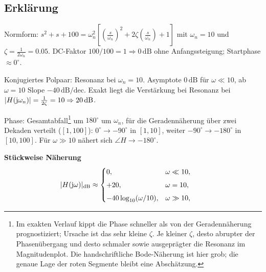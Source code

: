 \subsection{Erklärung}
\vspace{5mm}
\begin{description}[leftmargin=1.2em,labelsep=.6em,font=\bfseries]
\item[Schritt 1] Normform: $s^2+s+100=\omega_n^2\!\left[\left(\tfrac{s}{\omega_n}\right)^2+2\zeta\left(\tfrac{s}{\omega_n}\right)+1\right]$ mit $\omega_n=10$ und $\zeta=\tfrac{1}{2\omega_n}=0.05$. DC-Faktor $100/100=1\Rightarrow 0\,\mathrm{dB}$ ohne Anfangssteigung; Startphase $\approx0^\circ$.
\item[Schritt 2] Konjugiertes Polpaar: Resonanz bei $\omega_n=10$. Asymptote $0\,\mathrm{dB}$ für $\omega\ll10$, ab $\omega=10$ Slope $-40\,\mathrm{dB/dec}$. Exakt liegt die Verstärkung bei Resonanz bei $|H(\operatorname{j}\!\omega_n)|=\tfrac{1}{2\zeta}=10\Rightarrow20\,\mathrm{dB}$.
\item[Schritt 3] Phase: Gesamtabfall\footnote{Im exakten Verlauf kippt die Phase schneller als von der Geradennäherung prognostiziert; Ursache ist das sehr kleine \(\zeta\). Je kleiner \(\zeta\), desto abrupter der Phasenübergang und desto schmaler sowie ausgeprägter die Resonanz im Magnitudenplot. Die handschriftliche Bode-Näherung ist hier grob; die genaue Lage der roten Segmente bleibt eine Abschätzung.} um $180^\circ$ um $\omega_n$, für die Geradennäherung über zwei Dekaden verteilt ($[1,100]$): $0^\circ\to-90^\circ$ in $[1,10]$, weiter $-90^\circ\to-180^\circ$ in $[10,100]$. Für $\omega\gg10$ nähert sich $\angle H\to-180^\circ$.
\end{description}

\vspace{0.5cm}
\medskip
\noindent\textbf{Stückweise Näherung}
\[
|H(\operatorname{j}\!\omega)|_{\mathrm{dB}}\approx
\begin{cases}
0,& \omega\ll10,\\[4pt]
+20,& \omega=10,\\[4pt]
-40\log_{10}(\omega/10),& \omega\gg10,
\end{cases}
\qquad
\]
\newpage